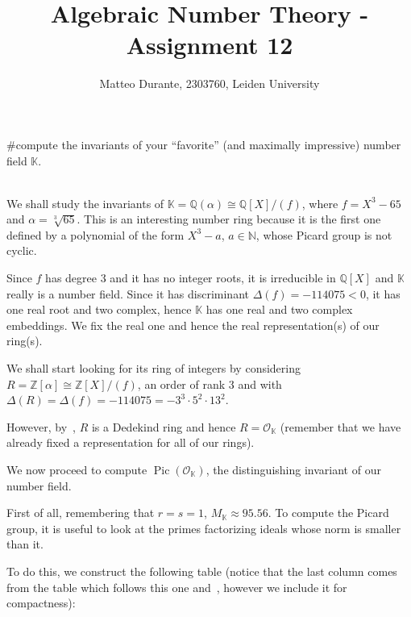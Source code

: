 \documentclass{article}
\newcommand{\numberset}{\mathbb}
\newcommand{\N}{\numberset{N}}
\newcommand{\Z}{\numberset{Z}}
\newcommand{\Q}{\numberset{Q}}
\newcommand{\K}{\numberset{K}}
\newcommand{\exercise}[1]{\noindent {\bf Exercise: }}
\newcommand{\Pic}{\operatorname{Pic}}
\begin{document}
\title{Algebraic Number Theory - Assignment 12}

\author{Matteo Durante, 2303760, Leiden University}

\maketitle

\exercise #compute the invariants of your ``favorite'' (and maximally impressive) number field $\K$.

~\\
We shall study the invariants of $\K=\Q(\alpha)\cong\Q[X]/(f)$, where $f=X^3-65$ and $\alpha=\sqrt[3]{65}$. This is an interesting number ring because it is the first one defined by a polynomial of the form $X^3-a$, $a\in\N$, whose Picard group is not cyclic.

Since $f$ has degree 3 and it has no integer roots, it is irreducible in $\Q[X]$ and $\K$ really is a number field. Since it has discriminant $\Delta(f)=-114075<0$, it has one real root and two complex, hence $\K$ has one real and two complex embeddings. We fix the real one and hence the real representation(s) of our ring(s).

We shall start looking for its ring of integers by considering $R=\Z[\alpha]\cong\Z[X]/(f)$, an order of rank 3 and with $\Delta(R)=\Delta(f)=-114075=-3^3\cdot 5^2\cdot 13^2$.

However, by~\cite[ex. 3.15]{stev}, $R$ is a Dedekind ring and hence $R=\mathcal{O}_{\K}$ (remember that we have already fixed a representation for all of our rings).

We now proceed to compute $\Pic(\mathcal{O}_{\K})$, the distinguishing invariant of our number field.

First of all, remembering that $r=s=1$, $M_{\K}\approx 95.56$. To compute the Picard group, it is useful to look at the primes factorizing ideals whose norm is smaller than it.

To do this, we construct the following table (notice that the last column comes from the table which follows this one and~\cite[thm. 7.2]{stev}, however we include it for compactness):
\end{document}

